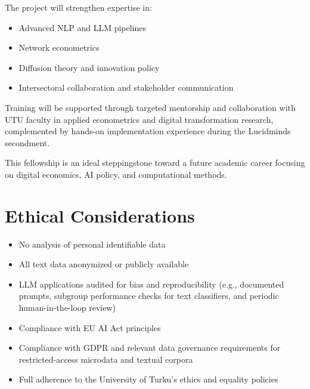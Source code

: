 \documentclass{nfr}
\begin{document}
The project will strengthen expertise in:

\begin{itemize}
\item Advanced NLP and LLM pipelines
\item Network econometrics
\item Diffusion theory and innovation policy
\item Intersectoral collaboration and stakeholder communication
\end{itemize}

Training will be supported through targeted mentorship and collaboration with UTU faculty in applied econometrics and digital transformation research, complemented by hands-on implementation experience during the Lucidminds secondment.

This fellowship is an ideal steppingstone toward a future academic career focusing on digital economics, AI policy, and computational methods.

\section{Ethical Considerations}

\begin{itemize}
\item No analysis of personal identifiable data
\item All text data anonymized or publicly available
\item LLM applications audited for bias and reproducibility (e.g., documented prompts, subgroup performance checks for text classifiers, and periodic human-in-the-loop review)
\item Compliance with EU AI Act principles
\item Compliance with GDPR and relevant data governance requirements for restricted-access microdata and textual corpora
\item Full adherence to the University of Turku’s ethics and equality policies
\end{itemize}

\nocite{*}


\end{document}
